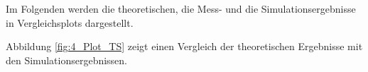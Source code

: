 \pgfmathsetmacro{\ReZsime}{\pgfplotsretval}
\of\dataSimZ
\pgfmathsetmacro{\ImZsima}{\pgfplotsretval}
\of\dataSimZ
\pgfmathsetmacro{\ImZsimb}{\pgfplotsretval}
\of\dataSimZ
\pgfmathsetmacro{\ImZsimc}{\pgfplotsretval}
\of\dataSimZ
\pgfmathsetmacro{\ImZsimd}{\pgfplotsretval}
\of\dataSimZ
\pgfmathsetmacro{\ImZsime}{\pgfplotsretval}
\of\dataSimY
\pgfmathsetmacro{\ReYsima}{\pgfplotsretval}
\of\dataSimY
\pgfmathsetmacro{\ReYsimb}{\pgfplotsretval}
\of\dataSimY
\pgfmathsetmacro{\ReYsimc}{\pgfplotsretval}
\of\dataSimY
\pgfmathsetmacro{\ReYsimd}{\pgfplotsretval}
\of\dataSimY
\pgfmathsetmacro{\ReYsime}{\pgfplotsretval}
\of\dataSimY
\pgfmathsetmacro{\ImYsima}{\pgfplotsretval}
\of\dataSimY
\pgfmathsetmacro{\ImYsimb}{\pgfplotsretval}
\of\dataSimY
\pgfmathsetmacro{\ImYsimc}{\pgfplotsretval}
\of\dataSimY
\pgfmathsetmacro{\ImYsimd}{\pgfplotsretval}
\of\dataSimY
\pgfmathsetmacro{\ImYsime}{\pgfplotsretval}
%
Im Folgenden werden die theoretischen, die Mess- und die Simulationsergebnisse in Vergleichsplots dargestellt.
\par
Abbildung \ref{fig:4_Plot_TS} zeigt einen Vergleich der theoretischen Ergebnisse mit den Simulationsergebnissen.
%
